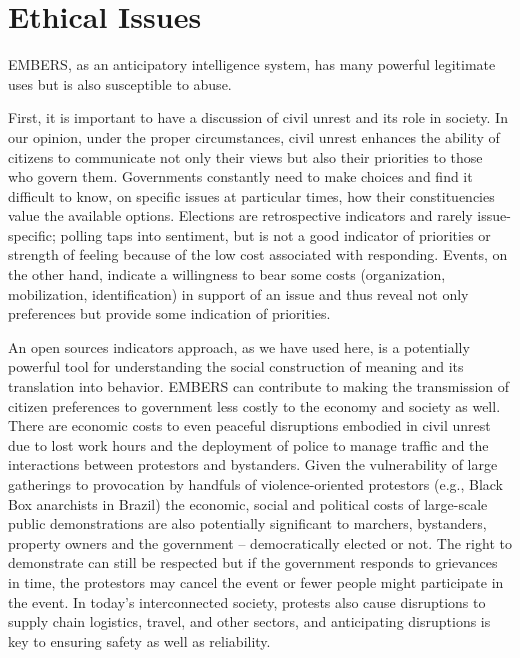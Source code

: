 \section{Ethical Issues}
\label{sec:ethics}
EMBERS, as an anticipatory intelligence system, has many powerful legitimate uses but is also
susceptible to abuse.

First, it is important to have a discussion of civil unrest and its role in society.
In our opinion, under the proper circumstances, 
civil unrest enhances the ability of citizens to communicate not only their views but also
their priorities to those who govern them. Governments constantly need to make choices and find
it difficult to know, on specific issues at particular times, how their constituencies value the available
options. Elections are retrospective indicators and rarely issue-specific; polling taps into sentiment,
but is not a good indicator of priorities or strength of feeling because of the
low cost associated with responding. Events, on the other hand, indicate a willingness to
bear some costs (organization, mobilization, identification) in support of an issue and
thus reveal not only preferences but provide some indication of priorities.

An open sources indicators approach, as we have used here, is a potentially powerful
tool for understanding the social construction of meaning and its translation into behavior.
EMBERS can contribute to making the transmission of citizen preferences to
government less costly to the economy and society as well. There are economic
costs to even peaceful disruptions embodied in civil unrest due to lost work
hours and the deployment of police to manage traffic and the interactions
between protestors and bystanders. Given the vulnerability of large gatherings
to provocation by handfuls of violence-oriented protestors (e.g., Black Box
anarchists in Brazil) the economic, social and political costs of
large-scale public demonstrations are also potentially significant to marchers, bystanders, property owners
and the government -- democratically elected or not. The right to demonstrate can still
be respected but if the government responds to grievances in time,
the protestors may cancel the event or fewer people might participate in the event.
In today's interconnected society, protests also cause disruptions to supply chain logistics, travel, and
other sectors, and anticipating disruptions is key to ensuring safety as well as reliability.

